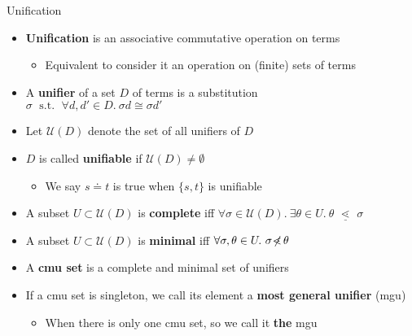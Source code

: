 \documentclass[pdf,fyma2]{prosper} %
\newcommand{\hilighten}[1]{{\color{fymablue}#1}}
\newcommand{\opr}[1]{\ensuremath{\operatorname{#1}}}
\newcommand{\UNIFIERS}{\ensuremath{\mathcal{U}\!}}
\newcommand{\isom}{\ensuremath{\cong}}
\newcommand{\subsume}{\ensuremath{\lessdot}}
\newcommand{\subsumeq}{\ensuremath{\,\,\underline{\!\subsume\!}\,\,}}
\newcommand{\notsubsume}{\ensuremath{\!\not\!\!\subsume\,}}
\renewcommand{\emph}[1]{\hilighten{\textbf{#1}}}
\newcommand{\defn}[1]{\textbf{#1}}
\begin{document}
\begin{slide}{Unification}
	\vspace{1em}
	\begin{itemize}
	\item \defn{Unification} is an associative commutative operation on terms
        \begin{itemize}
        \item Equivalent to consider it an operation on (finite) sets of terms
        \end{itemize}
    \item A \defn{unifier} of a set $D$ of terms is a substitution
        \\ $\sigma \opr{~s.t.~} \forall d,d'\in D.~ \sigma d \isom \sigma d'$
    \item Let $\UNIFIERS(D)$ denote the set of all unifiers of $D$
    \item $D$ is called \defn{unifiable} if $\UNIFIERS(D) \neq \emptyset$
        \begin{itemize}
        \item We say $s \doteq t$ is true when $\{s,t\}$ is unifiable
        \end{itemize}
    \item A subset $U \subset \UNIFIERS(D)$ is \defn{complete} iff $\forall \sigma \in \UNIFIERS(D).~ \exists \theta \in U.~ \theta \subsumeq \sigma$
    \item A subset $U \subset \UNIFIERS(D)$ is \defn{minimal} iff $\forall \sigma,\theta \in U.~ \sigma \notsubsume \theta$
    \item A \defn{cmu set} is a complete and minimal set of unifiers
    \item If a cmu set is singleton, we call its element a \defn{most general unifier} (mgu)
        \begin{itemize}
        \item When there is only one cmu set, so we call it \emph{the} mgu
        \end{itemize}
    \end{itemize}
\end{slide}
\end{document}
